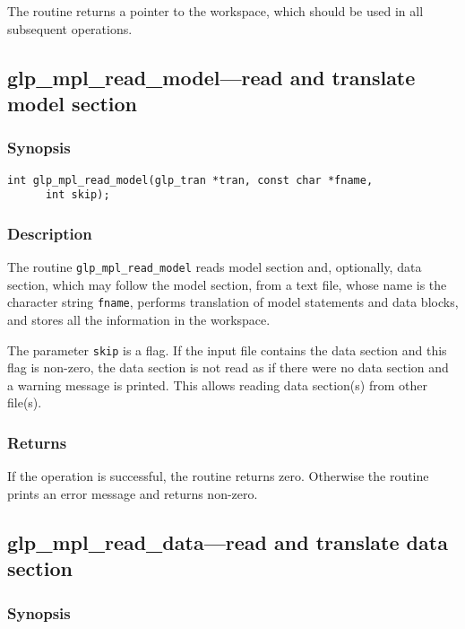 The routine returns a pointer to the workspace, which should be used in
all subsequent operations.

\subsection{glp\_mpl\_read\_model---read and translate model section}

\subsubsection*{Synopsis}

\begin{verbatim}
int glp_mpl_read_model(glp_tran *tran, const char *fname,
      int skip);
\end{verbatim}

\subsubsection*{Description}

The routine \verb|glp_mpl_read_model| reads model section and,
optionally, data section, which may follow the model section, from a
text file, whose name is the character string \verb|fname|, performs
translation of model statements and data blocks, and stores all the
information in the workspace.

The parameter \verb|skip| is a flag. If the input file contains the
data section and this flag is non-zero, the data section is not read as
if there were no data section and a warning message is printed. This
allows reading data section(s) from other file(s).

\subsubsection*{Returns}

If the operation is successful, the routine returns zero. Otherwise
the routine prints an error message and returns non-zero.

\subsection{glp\_mpl\_read\_data---read and translate data section}

\subsubsection*{Synopsis}

